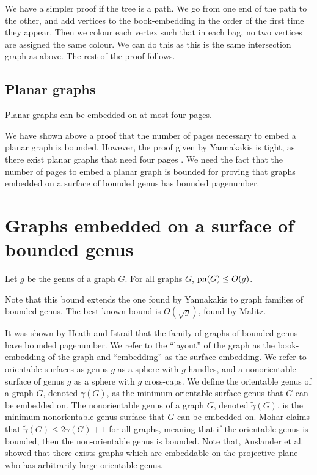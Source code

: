 We have a simpler proof if the tree is a path. We go from one end of the path to the other, and add vertices to the book-embedding in the order of the first time they appear. Then we colour each vertex such that in each bag, no two vertices are assigned the same colour. We can do this as this is the same intersection graph as above. The rest of the proof follows.

\subsection{Planar graphs}\label{ssec:Planar_Graphs}
\begin{theorem} \label{thm:4Pages_Planar}
	Planar graphs can be embedded on at most four pages.
\end{theorem}
We have shown above a proof that the number of pages necessary to embed a planar graph is bounded. However, the proof given by Yannakakis is tight, as there exist planar graphs that need four pages \cite{yannakakisPlanarGraphsThat2020} \cite{kaufmannFourPagesAre2020}. We need the fact that the number of pages to embed a planar graph is bounded for proving that graphs embedded on a surface of bounded genus has bounded pagenumber. 

\section{Graphs embedded on a surface of bounded genus}\label{sec:pagenumber_bounded_genus}

\begin{theorem}\label{thm:Genus_pagenumber_bound}
	Let \(g\) be the genus of a graph \(G\). For all graphs \(G\), \(\operatorname{pn}(G) \leq O(g)\).
\end{theorem}
Note that this bound extends the one found by Yannakakis \cite{yannakakisEmbeddingPlanarGraphs1989} to graph families of bounded genus. 
The best known bound is \(O(\sqrt{g})\), found by Malitz\cite{malitzGenusGraphsHave1994}.

It was shown by Heath and Istrail that the family of graphs of bounded genus have bounded pagenumber. 
We refer to the ``layout'' of the graph as the book-embedding of the graph and ``embedding'' as the surface-embedding. We refer to orientable surfaces as genus \(g\) as a sphere with \(g\) handles, and a nonorientable surface of genus \(g\) as a sphere with \(g\) cross-caps. We define the orientable genus of a graph \(G\), denoted \(\gamma(G)\), as the minimum orientable surface genus that \(G\) can be embedded on. The nonorientable genus of a graph \(G\), denoted \(\tilde{\gamma}(G)\), is the minimum nonorientable genus surface that \(G\) can be embedded on. Mohar\cite{moharOrientableGenusGraphs1998} claims that \(\tilde{\gamma}(G) \leq 2 \gamma(G) + 1\) for all graphs, meaning that if the orientable genus is bounded, then the non-orientable genus is bounded. Note that, Auslander et al.\cite{auslanderImbeddingGraphsManifolds1963} showed that there exists graphs which are embeddable on the projective plane who has arbitrarily large orientable genus. 
